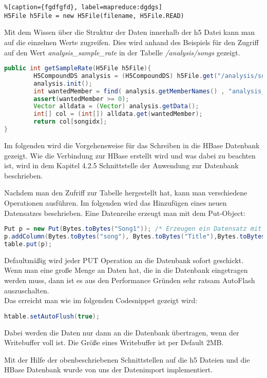 \begin{lstlisting}%[caption={fgdfgfd}, label=mapreduce:dgdgs]
H5File h5File = new H5File(filename, H5File.READ)
\end{lstlisting}

Mit dem Wissen über die Struktur der Daten innerhalb der h5 Datei kann man auf die einzelnen Werte zugreifen. Dies wird anhand des Beispiels für den Zugriff auf den Wert \textit{analysis\_sample\_rate} in der Tabelle \textit{/analysis/songs} gezeigt.

\begin{lstlisting}[language=Java]
public int getSampleRate(H5File h5File){
        H5CompoundDS analysis = (H5CompoundDS) h5File.get("/analysis/songs");
        analysis.init();
        int wantedMember = find( analysis.getMemberNames() , "analysis_sample_rate");
        assert(wantedMember >= 0);
        Vector alldata = (Vector) analysis.getData();
        int[] col = (int[]) alldata.get(wantedMember);
        return col[songidx];
}
\end{lstlisting}

Im folgenden wird die Vorgehensweise für das Schreiben in die HBase Datenbank gezeigt. Wie die Verbindung zur HBase erstellt wird und was dabei zu beachten ist, wird in dem Kapitel 4.2.5 Schnittstelle der Anwendung zur Datenbank beschrieben.

Nachdem man den Zufriff zur Tabelle hergestellt hat, kann man verschiedene Operationen ausführen.
Im folgenden wird das Hinzufügen eines neuen Datensatzes beschrieben.
Eine Datenreihe erzeugt man mit dem Put-Object:

\begin{lstlisting}[language=Java]
Put p = new Put(Bytes.toBytes("Song1")); /* Erzeugen ein Datensatz mit dem RowKey = "Song1'' */
p.addColumn(Bytes.toBytes("song"), Bytes.toBytes("Title"),Bytes.toBytes("HISTORY")); /* Erzeuge fuer diesen RowKey inder Spaltenfamileie "Song" die Splate "Title" mit dem Wert "HISTORY" */
table.put(p);
\end{lstlisting}

Defaultmäßig wird jeder PUT Operation an die Datenbank sofort geschickt. Wenn man eine große Menge an Daten hat, die in die Datenbank eingetragen werden muss, dann ist es aus den Performance Gründen sehr ratsam AutoFlash auszuschalten. \\
Das erreicht man wie im folgenden Codesnippet gezeigt wird:
\begin{lstlisting}[language=Java]
htable.setAutoFlush(true);
\end{lstlisting}
Dabei werden die Daten nur dann an die Datenbank übertragen, wenn der Writebuffer voll ist. Die Größe eines Writebuffer ist per Default 2MB. 

Mit der Hilfe der obenbeschriebenen Schnittstellen auf die h5 Dateien und die HBase Datenbank wurde von uns der Datenimport implementiert.

